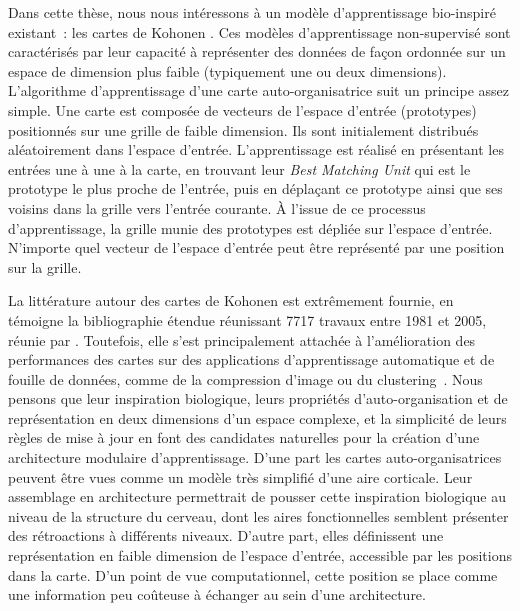 Dans cette thèse, nous nous intéressons à un modèle d'apprentissage bio-inspiré existant~: les cartes de Kohonen \parencite{Kohonen1982}. Ces modèles d'apprentissage non-supervisé sont caractérisés par leur capacité à représenter des données de façon ordonnée sur un espace de dimension plus faible (typiquement une ou deux dimensions).
L'algorithme d'apprentissage d'une carte auto-organisatrice suit un principe assez simple. Une carte est composée de vecteurs de l'espace d'entrée (prototypes) positionnés sur une grille de faible dimension.
Ils sont initialement distribués aléatoirement dans l'espace d'entrée. 
L'apprentissage est réalisé en présentant les entrées une à une à la carte, en trouvant leur \emph{Best Matching Unit} qui est le prototype le plus proche de l'entrée, puis en déplaçant ce prototype ainsi que ses voisins dans la grille vers l'entrée courante.
\`A l'issue de ce processus d'apprentissage, la grille munie des prototypes est dépliée sur l'espace d'entrée. N'importe quel vecteur de l'espace d'entrée peut être représenté par une position sur la grille.

La littérature autour des cartes de Kohonen est extrêmement fournie, en témoigne la bibliographie étendue réunissant 7717 travaux entre 1981 et 2005, réunie par \cite{Kaski1998BibliographyOS,oja_bibliography_2002,Honkela2009BIBLIOGRAPHYOS}.
Toutefois, elle s'est principalement attachée à l'amélioration des performances des cartes sur des applications d'apprentissage automatique et de fouille de données, comme de la compression d'image ou du clustering~\parencite{kohonen_essentials_2013}.
Nous pensons que leur inspiration biologique, leurs propriétés d'auto-organisation et de représentation en deux dimensions d'un espace complexe, et la simplicité de leurs règles de mise à jour en font des candidates naturelles pour la création d'une architecture modulaire d'apprentissage.
D'une part les cartes auto-organisatrices peuvent être vues comme un modèle très simplifié d'une aire corticale. Leur assemblage en architecture permettrait de pousser cette inspiration biologique au niveau de la structure du cerveau, dont les aires fonctionnelles semblent présenter des rétroactions à différents niveaux.
D'autre part, elles définissent une représentation en faible dimension de l'espace d'entrée, accessible par les positions dans la carte. D'un point de vue computationnel, cette position se place comme une information peu coûteuse à échanger au sein d'une architecture.

